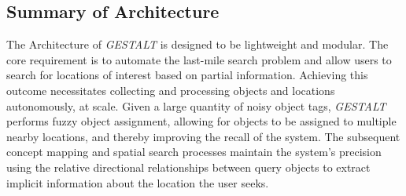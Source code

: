 \subsection{Summary of Architecture}
The Architecture of \textit{GESTALT} is designed to be lightweight and modular. The core requirement is to automate the last-mile search problem and allow users to search for locations of interest based on partial information. 
Achieving this outcome necessitates collecting and processing objects and locations autonomously, at scale.
Given a large quantity of noisy object tags, \emph{GESTALT} performs fuzzy object assignment, allowing for objects to be assigned to multiple nearby locations, and thereby improving the recall of the system.
The subsequent concept mapping and spatial search processes maintain the system's precision using the relative directional relationships between query objects to extract implicit information about the location the user seeks. 